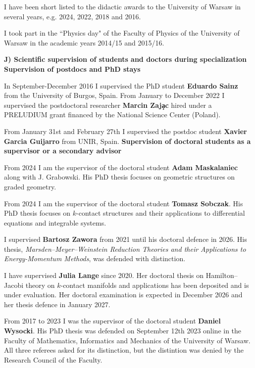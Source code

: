 \documentclass[12pt,reqno]{amsbook}
\begin{document}
I have been short listed to the didactic awards to the University of Warsaw in several years, e.g. 2024, 2022, 2018 and 2016.


I took part in the ``Physics day" of the Faculty of Physics of the University of Warsaw in the academic years 2014/15 and 2015/16.


\vspace{0.5cm}



{\bf J) Scientific supervision of students and doctors during specialization}
\vskip 0.5cm
{\bf Supervision of postdocs and PhD stays}

In September-December 2016  I supervised the PhD student {\bf Eduardo Sainz} from the University of Burgos, Spain.
From January to December 2022 I supervised the postdoctoral researcher {\bf Marcin Zaj\c ac} hired under a PRELUDIUM grant financed by the National Science Center (Poland). 

From January 31st and February 27th I supervised the postdoc student {\bf Xavier Garcia Guijarro} from UNIR, Spain.
\vskip 0.5cm
{\bf Supervision of doctoral students as a supervisor or a secondary advisor}

\vskip 0.5cm

From 2024 I am the supervisor of the doctoral student {\bf Adam Maskalaniec} along with J. Grabowski. His PhD thesis focuses on geometric structures on graded geometry.

From 2024 I am the supervisor of the   doctoral student {\bf Tomasz Sobczak}. His PhD thesis focuses on $k$-contact structures and their applications to differential equations and integrable systems.

I supervised {\bf Bartosz Zawora} from 2021 until his doctoral defence in 2026. His thesis, {\it Marsden--Meyer--Weinstein Reduction Theories and their Applications to Energy-Momentum Methods}, was defended with distinction.

I have supervised {\bf Julia Lange} since 2020. Her doctoral thesis on Hamilton--Jacobi theory on $k$-contact manifolds and applications has been deposited and is under evaluation. Her doctoral examination is expected in December 2026 and her thesis defence in January 2027.

From 2017 to 2023 I was the supervisor of the doctoral student {\bf Daniel Wysocki}. His PhD thesis was defended on September 12th 2023 online in the Faculty of Mathematics, Informatics and Mechanics of the University of Warsaw. All three referees asked for its distinction, but the distintion was denied by the Research Council of the Faculty.
\end{document}
